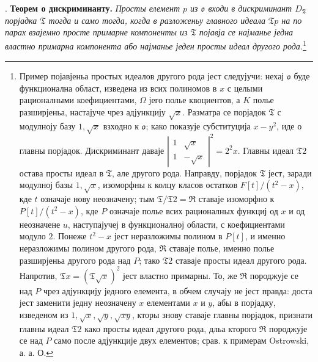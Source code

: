 \documentclass[11pt]{article}
\newcommand{\mo}{\mathfrak{o}}
\newcommand{\mT}{\mathfrak{T}}
\newcommand{\mR}{\mathfrak{R}}
\begin{document}
\setcounter{footnote}{28}

. \textbf{Теорем о дискриминанту.} \emph{Просты елемент $p$ из $\mo$ входи в дискриминант $D_\mT$ порјадка $\mT$ тогда и само тогда, когда в разложеньу главного идеала $\mT p$ на по парах взајемно просте примарне компоненты из $\mT$ појавја се најманье једна властно примарна компонента або најманье једен просты идеал другого рода.}\footnote{Пример појавјеньа простых идеалов другого рода јест следујучи: нехај $\mo$ буде функционална област, изведена из всих полиномов в $x$ с целыми рационалными коефициентами, $\Omega$ јего полье квоциентов, а $K$ полье разширјеньа, настајуче чрез адјункцију $\sqrt{x}$. Разматра се порјадок $\mT$ с модулноју базу $1,\sqrt{x}$ взходно к $\mo$; како показује субституција $x-y^2$, иде о главны порјадок. Дискриминант даваје $\left|\begin{smallmatrix}1&\sqrt{x}\\1&-\sqrt{x}\end{smallmatrix}\right|^2=2^2x$. Главны идеал $\mT2$ остава просты идеал в $\mT$, але другого рода. Направду, порјадок $\mT$ јест, заради модулној базы $1,\sqrt{x}$, изоморфны к колцу класов остатков $F[t]/(t^2-x)$, кде $t$ означаје нову неозначену; тым $\mT/\mT2=\mR$ ставаје изоморфно к $P[t]/(t^2-x)$, кде $P$ означаје полье всих рационалных функциј од $x$ и од неозначене $u$, наступајучеј в функционалној области, с коефициентами модуло $2$. Понеже $t^2-x$ јест неразложимы полином в $P[t]$, и именно неразложимы полином другого рода, $\mR$ ставаје полье, именно полье разширјеньа другого рода над $P$; тако $\mT2$ ставаје просты идеал другого рода. Напротив, $\mT x=(\mT\sqrt{x})^2$ јест властно примарны. То, же $\mR$ породжује се над $P$ чрез адјункцију једного елемента, в обчем случају не јест правда: доста јест заменити једну неозначену $x$ елементами $x$ и $y$, абы в порјадку, изведеном из $1,\sqrt{x},\sqrt{y},\sqrt{xy}$, кторы знову ставаје главны порјадок, признати главны идеал $\mT2$ како просты идеал другого рода, дльа кторого $\mR$ породжује се над $P$ само после адјункције двух елементов; срав. к примерам Ostrowski, а. а. О.}
\end{document}

